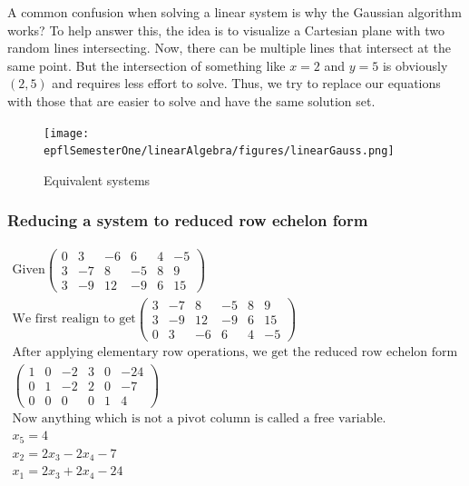 \documentclass{article}
\numberwithin{equation}{subsection}
\begin{document}
A common confusion when solving a linear system is why the Gaussian algorithm works? To help answer this, the idea is to visualize a Cartesian plane with two random lines intersecting. Now, there can be multiple lines that intersect at the same point. But the intersection of something like $x=2$ and $y=5$ is obviously $(2,5)$ and requires less effort to solve. Thus, we try to replace our equations with those that are easier to solve and have the same solution set. 

\begin{figure}[h]
    \centering
    \texttt{[image: epflSemesterOne/linearAlgebra/figures/linearGauss.png]}
    \caption{Equivalent systems}
    \label{fig1}
\end{figure}

\subsubsection{Reducing a system to reduced row echelon form}

\begin{tcolorbox}
    \begin{align*}
     \text{Given} \left(\begin{matrix}0&3&-6&6&4&-5\\3&-7&8&-5&8&9\\3&-9&12&-9&6&15\end{matrix}\right)\\
     \text{We first realign to get} \left(\begin{matrix}3&-7&8&-5&8&9\\3&-9&12&-9&6&15\\0&3&-6&6&4&-5\end{matrix}\right) \\
     \text{After applying elementary row operations, we get the reduced row echelon form of}\\
     \left(\begin{matrix}1&0&-2&3&0&-24\\0&1&-2&2&0&-7\\0&0&0&0&1&4\end{matrix}\right)\\ 
     \text{Now anything which is not a pivot column is called a free variable.}\\
     x_{5} = 4\\
     x_{2} = 2x_{3} - 2x_{4} - 7\\
     x_{1} = 2x_{3} + 2x_{4} - 24
     \end{align*}
\end{tcolorbox}
\end{document}
